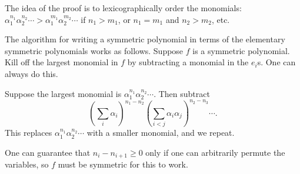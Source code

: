 \documentclass[11pt, oneside,margin=1in]{article}
\begin{document}
The idea of the proof is to lexicographically order the monomials: $\alpha_1^{n_1}\alpha_2^{n_2}\cdots > \alpha_1^{m_1}\alpha_2^{m_2}\cdots$ if $n_1>m_1$, or $n_1=m_1$ and $n_2> m_2$, etc.

The algorithm for writing a symmetric polynomial in terms of the elementary symmetric polynomials works as follows. Suppose $f$ is a symmetric polynomial. Kill off the largest monomial in $f$ by subtracting a monomial in the $e_i$s. One can always do this.

Suppose the largest monomial is $\alpha_1^{n_1}\alpha_2^{n_2}\cdots$. Then subtract $$\left( \sum_i\alpha_i \right) ^{n_1-n_2}\left( \sum_{i<j}\alpha_i\alpha_j \right) ^{n_2-n_3}\cdots.$$ This replaces $\alpha_1^{n_1}\alpha_2^{n_2}\cdots$ with a smaller monomial, and we repeat.

One can guarantee that $n_i - n_{i+1}\ge 0$ only if one can arbitrarily permute the variables, so $f$ must be symmetric for this to work.
\end{document}
